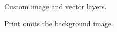 \documentclass[a5paper]{seasonalletter}
\begin{document}
\begin{SeasonalLetter}Custom image and vector layers.\end{SeasonalLetter}
\SeasonalSetArtwork{}
\begin{SeasonalLetter}[output=print]Print omits the background image.\end{SeasonalLetter}
\end{document}
